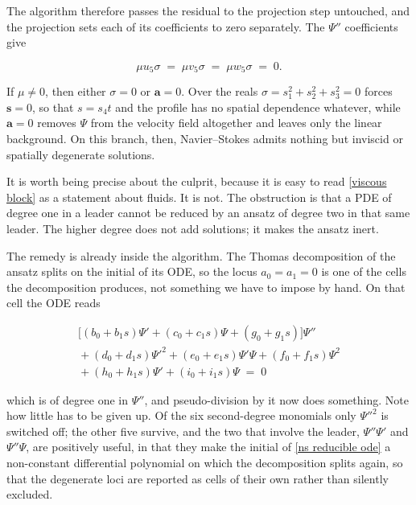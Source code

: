 \documentclass{article}
\theoremstyle{definition}
\theoremstyle{plain}
\begin{document}
\begin{nsexample}
The algorithm therefore passes the residual to the projection step untouched,
and the projection sets each of its coefficients to zero separately.  The
$\Psi''$ coefficients give

\begin{equation}
\label{viscous block}
\mu u_5 \sigma \;=\; \mu v_5 \sigma \;=\; \mu w_5 \sigma \;=\; 0 .
\end{equation}

If $\mu \ne 0$, then either $\sigma = 0$ or $\mathbf{a} = 0$.  Over the reals
$\sigma = s_1^2+s_2^2+s_3^2 = 0$ forces $\mathbf{s} = 0$, so that $s = s_4 t$
and the profile has no spatial dependence whatever, while $\mathbf{a} = 0$
removes $\Psi$ from the velocity field altogether and leaves only the linear
background.  On this branch, then, Navier--Stokes admits nothing but inviscid
or spatially degenerate solutions.

It is worth being precise about the culprit, because it is easy to read
\eqref{viscous block} as a statement about fluids.  It is not.  The obstruction
is that a PDE of degree one in a leader cannot be reduced by an ansatz of
degree two in that same leader.  The higher degree does not add solutions; it
makes the ansatz inert.

The remedy is already inside the algorithm.  The Thomas decomposition of the
ansatz splits on the initial of its ODE, so the locus $a_0 = a_1 = 0$ is one of
the cells the decomposition produces, not something we have to impose by hand.
On that cell the ODE reads

\begin{equation}
\label{ns reducible ode}
\begin{gathered}
\bigl[(b_0+b_1 s)\Psi' + (c_0+c_1 s)\Psi + (g_0+g_1 s)\bigr]\Psi'' \\
{} + (d_0+d_1 s)\Psi'^2 + (e_0+e_1 s)\Psi'\Psi + (f_0+f_1 s)\Psi^2 \\
{} + (h_0+h_1 s)\Psi' + (i_0+i_1 s)\Psi \;=\; 0
\end{gathered}
\end{equation}

\noindent
which is of degree one in $\Psi''$, and pseudo-division by it now does
something.  Note how little has to be given up.  Of the six second-degree
monomials only $\Psi''^2$ is switched off; the other five survive, and the two
that involve the leader, $\Psi''\Psi'$ and $\Psi''\Psi$, are positively useful,
in that they make the initial of \eqref{ns reducible ode} a non-constant
differential polynomial on which the decomposition splits again, so that the
degenerate loci are reported as cells of their own rather than silently
excluded.


\end{nsexample}
\end{document}
